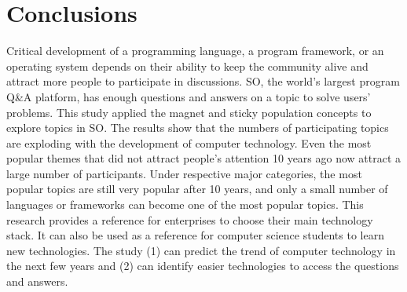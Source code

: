 \documentclass[english,preprint,JIP,technote]{ipsj}
\begin{document}
\section{Conclusions}
Critical development of a programming language, a program framework, or an operating system depends on their ability to keep the community alive and attract more people to participate in discussions. SO, the world’s largest program Q\&A platform, has enough questions and answers on a topic to solve users’ problems. This study applied the magnet and sticky population concepts to explore topics in SO. The results show that the numbers of participating topics are exploding with the development of computer technology. Even the most popular themes that did not attract people’s attention 10 years ago now attract a large number of participants. Under respective major categories, the most popular topics are still very popular after 10 years, and only a small number of languages or frameworks can become one of the most popular topics. This research provides a reference for enterprises to choose their main technology stack. It can also be used as a reference for computer science students to learn new technologies. The study (1) can predict the trend of computer technology in the next few years and (2) can identify easier technologies to access the questions and answers.






\end{document}
